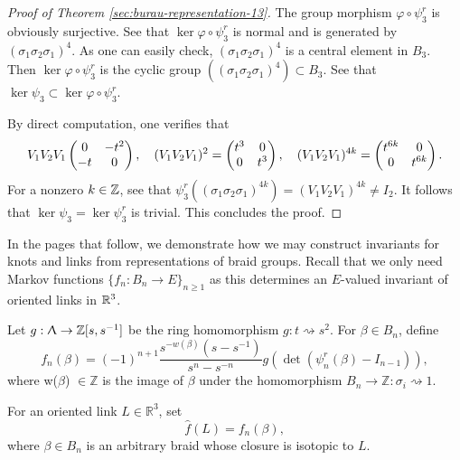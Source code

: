 \begin{proof}[Proof of Theorem \ref{sec:burau-representation-13}]
\label{sec:burau-representation-14}
The group morphism $\varphi \circ \psi_3^r$ is obviously surjective. See that $\ker{\varphi \circ \psi_3^r}$ is normal and is generated by $(\sigma_1\sigma_2\sigma_1)^4$. As one can easily check, $(\sigma_1\sigma_2\sigma_1)^4$ is a central element in $B_3$. Then $\ker{\varphi \circ \psi_3^r}$ is the cyclic group $((\sigma_1\sigma_2\sigma_1)^4) \subset B_3$. See that $\ker{\psi_3} \subset \ker{\varphi \circ \psi_3^r}$.

By direct computation, one verifies that
\begin{displaymath}
V_1V_2V_1 \begin{pmatrix} 0 & -t^2 \\ -t & 0 \end{pmatrix}, \hspace*{1em} (V_1V_2V_1)^2 = \begin{pmatrix} t^3 & 0 \\ 0 & t^3 \end{pmatrix}, \hspace*{1em} (V_1V_2V_1)^{4k} = \begin{pmatrix} t^{6k} & 0 \\ 0 & t^{6k} \end{pmatrix}.
\end{displaymath}
For a nonzero $k \in \mathbb{Z}$, see that $\psi_3^r((\sigma_1\sigma_2\sigma_1)^{4k}) = (V_1V_2V_1)^{4k} \ne I_2 $. It follows that $\ker{\psi_3} = \ker{\psi_3^r}$ is trivial. This concludes the proof.
\end{proof}

In the pages that follow, we demonstrate how we may construct invariants for knots and links from representations of braid groups. Recall that we only need Markov functions $\{ f_n : B_n \to E\}_{n\geq 1}$ as this determines an $E$-valued invariant of oriented links in $\mathbb{R}^3$.

Let $g: \Uplambda \to \mathbb{Z}[s, s^{-1}]$ be the ring homomorphism $g: t \rightsquigarrow s^2$. For $\beta \in B_n$, define
\begin{displaymath}
f_n(\beta) = (-1)^{n+1} \frac{s^{-w(\beta)} (s-s^{-1})}{s^n-s^{-n}} g(\det(\psi^r_n(\beta) - I_{n-1})),
\end{displaymath}
where w($\beta$) $\in \mathbb{Z}$ is the image of $\beta$ under the homomorphism $B_n \to \mathbb{Z} : \sigma_i \rightsquigarrow 1$.

For an oriented link $L \in \mathbb{R}^3$, set 
\begin{displaymath}
  \hat{f}(L) = f_n(\beta),
\end{displaymath}
where $\beta \in B_n$ is an arbitrary braid whose closure is isotopic to $L$.

